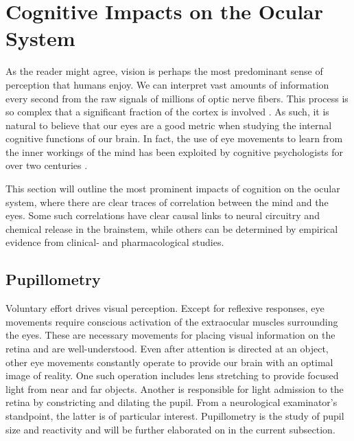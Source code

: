\section{Cognitive Impacts on the Ocular System} \label{sec:bt/cognitive_impacts}

As the reader might agree, vision is perhaps the most predominant sense of perception that humans enjoy. We can interpret vast amounts of information every second from the raw signals of millions of optic nerve fibers. This process is so complex that a significant fraction of the cortex is involved \cite{klatzky2012}. As such, it is natural to believe that our eyes are a good metric when studying the internal cognitive functions of our brain. In fact, the use of eye movements to learn from the inner workings of the mind has been exploited by cognitive psychologists for over two centuries \cite{wells1792}. 

This section will outline the most prominent impacts of cognition on the ocular system, where there are clear traces of correlation between the mind and the eyes. Some such correlations have clear causal links to neural circuitry and chemical release in the brainstem, while others can be determined by empirical evidence from clinical- and pharmacological studies.


\subsection{Pupillometry}

Voluntary effort drives visual perception. Except for reflexive responses, eye movements require conscious activation of the extraocular muscles surrounding the eyes. These are necessary movements for placing visual information on the retina and are well-understood. Even after attention is directed at an object, other eye movements constantly operate to provide our brain with an optimal image of reality. One such operation includes lens stretching to provide focused light from near and far objects. Another is responsible for light admission to the retina by constricting and dilating the pupil. From a neurological examinator's standpoint, the latter is of particular interest. Pupillometry is the study of pupil size and reactivity and will be further elaborated on in the current subsection.

